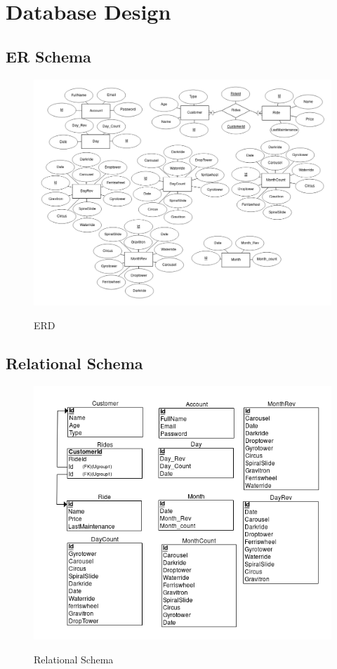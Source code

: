 \chapter{Database Design}


\section{ER Schema}
\begin{figure}[H]
\centering
\caption{ERD}
\includegraphics[scale=.5]{./erd.png}
\\[0.2in]
\label{fig:ER diagram}
\end{figure}

\thispagestyle{fancy}

\section{Relational Schema}
\begin{figure}[H]
\centering
\caption{Relational Schema}
\includegraphics[scale=.7]{./schema.png}
\\[0.2in]
\label{fig:Relational Schema}
\end{figure}

\thispagestyle{fancy}
